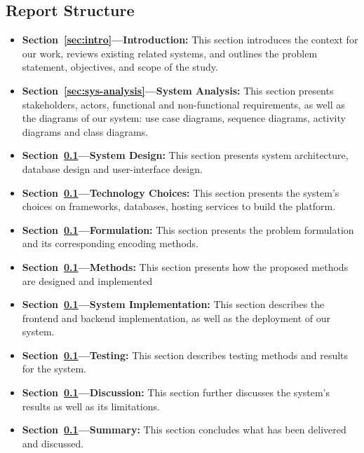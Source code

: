     \subsection{Report Structure}
\begin{itemize}
    \item \textbf{Section~\ref{sec:intro}---Introduction:} This section introduces the context for our work, reviews existing related systems, and outlines the problem statement, objectives, and scope of the study.
    \item \textbf{Section~\ref{sec:sys-analysis}---System Analysis:} This section presents stakeholders, actors, functional and non-functional requirements, as well as the diagrams of our system: use case diagrams, sequence diagrams, activity diagrams and class diagrams.
    \item \textbf{Section~\ref{}---System Design:} This section presents system architecture, database design and user-interface design.
    \item \textbf{Section~\ref{}---Technology Choices:} This section presents the system's choices on frameworks, databases, hosting services to build the platform.
    \item \textbf{Section~\ref{}---Formulation:} This section presents the problem formulation and its corresponding encoding methods.
    \item \textbf{Section~\ref{}---Methods:} This section presents how the proposed methods are designed and implemented
    \item \textbf{Section~\ref{}---System Implementation:} This section describes the frontend and backend implementation, as well as the deployment of our system.
    \item \textbf{Section~\ref{}---Testing:} This section describes testing methods and results for the system. %
    \item \textbf{Section~\ref{}---Discussion:} This section further discusses the system's results as well as its limitations.
    \item \textbf{Section~\ref{}---Summary:} This section concludes what has been delivered and discussed.
\end{itemize}